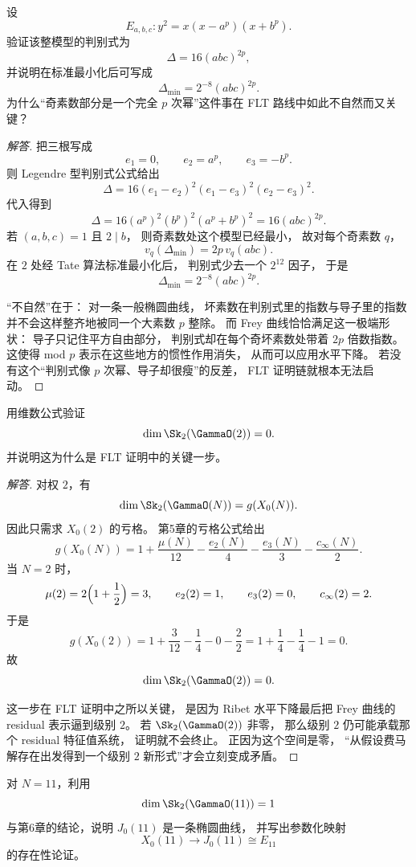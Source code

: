 \begin{exercise}
设
\[
  E_{a,b,c}\colon y^2=x(x-a^p)(x+b^p).
\]
验证该整模型的判别式为
\[
  \Delta=16(abc)^{2p},
\]
并说明在标准最小化后可写成
\[
  \Delta_{\min}=2^{-8}(abc)^{2p}.
\]
为什么“奇素数部分是一个完全 $p$ 次幂”这件事在 FLT 路线中如此不自然而又关键？
\end{exercise}

\begin{proof}[解答]
把三根写成
\[
  e_1=0,
  \qquad e_2=a^p,
  \qquad e_3=-b^p.
\]
则 Legendre 型判别式公式给出
\[
  \Delta=16(e_1-e_2)^2(e_1-e_3)^2(e_2-e_3)^2.
\]
代入得到
\[
  \Delta=16(a^p)^2(b^p)^2(a^p+b^p)^2=16(abc)^{2p}.
\]
若 $(a,b,c)=1$ 且 $2\mid b$，
则奇素数处这个模型已经最小，
故对每个奇素数 $q$，
\[
  v_q(\Delta_{\min})=2p\,v_q(abc).
\]
在 $2$ 处经 Tate 算法标准最小化后，
判别式少去一个 $2^{12}$ 因子，
于是
\[
  \Delta_{\min}=2^{-8}(abc)^{2p}.
\]

“不自然”在于：
对一条一般椭圆曲线，
坏素数在判别式里的指数与导子里的指数并不会这样整齐地被同一个大素数 $p$ 整除。
而 Frey 曲线恰恰满足这一极端形状：
导子只记住平方自由部分，
判别式却在每个奇坏素数处带着 $2p$ 倍数指数。
这使得 mod $p$ 表示在这些地方的惯性作用消失，
从而可以应用水平下降。
若没有这个“判别式像 $p$ 次幂、导子却很瘦”的反差，
FLT 证明链就根本无法启动。
\end{proof}

\begin{exercise}
用维数公式验证
\[
  \dim \Sk_2(\GammaO(2))=0.
\]
并说明这为什么是 FLT 证明中的关键一步。
\end{exercise}

\begin{proof}[解答]
对权 $2$，有
\[
  \dim \Sk_2(\GammaO(N))=g(X_0(N)).
\]
因此只需求 $X_0(2)$ 的亏格。
第5章的亏格公式给出
\[
  g(X_0(N))=1+\frac{\mu(N)}{12}-\frac{e_2(N)}{4}-\frac{e_3(N)}{3}-\frac{c_\infty(N)}{2}.
\]
当 $N=2$ 时，
\[
  \mu(2)=2\Bigl(1+\frac12\Bigr)=3,
  \qquad e_2(2)=1,
  \qquad e_3(2)=0,
  \qquad c_\infty(2)=2.
\]
于是
\[
  g(X_0(2))
  =1+\frac{3}{12}-\frac14-0-\frac22
  =1+\frac14-\frac14-1=0.
\]
故
\[
  \dim \Sk_2(\GammaO(2))=0.
\]

这一步在 FLT 证明中之所以关键，
是因为 Ribet 水平下降最后把 Frey 曲线的 residual 表示逼到级别 $2$。
若 $\Sk_2(\GammaO(2))$ 非零，
那么级别 $2$ 仍可能承载那个 residual 特征值系统，
证明就不会终止。
正因为这个空间是零，
“从假设费马解存在出发得到一个级别 $2$ 新形式”才会立刻变成矛盾。
\end{proof}

\begin{exercise}
对 $N=11$，利用
\[
  \dim \Sk_2(\GammaO(11))=1
\]
与第6章的结论，说明 $J_0(11)$ 是一条椭圆曲线，
并写出参数化映射
\[
  X_0(11)\to J_0(11)\cong E_{11}
\]
的存在性论证。
\end{exercise}

